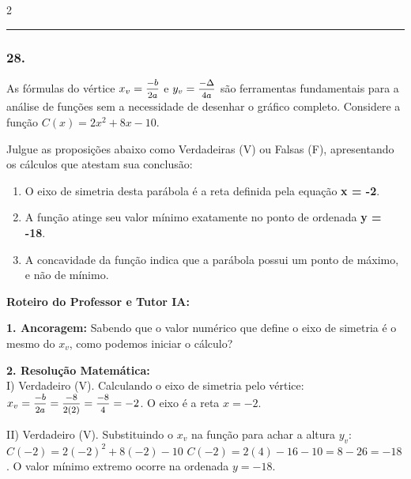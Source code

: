 \begin{multicols*}{2}
\noindent\textcolor{CorLinha}{\rule{\linewidth}{0.5pt}} 
\par\vspace{\espacoPreQuestao}
\subsubsection*{28.} 
\begin{enunciadoLiteral}
As fórmulas do vértice $x_v = \mfrac{-b}{2a}$ e $y_v = \mfrac{-\Delta}{4a}$ são ferramentas fundamentais para a análise de funções sem a necessidade de desenhar o gráfico completo. Considere a função $C(x) = 2x^2 + 8x - 10$.

Julgue as proposições abaixo como Verdadeiras (V) ou Falsas (F), apresentando os cálculos que atestam sua conclusão:

\begin{enumerate}[label=\Roman*., itemsep=\espacoAlt]
    \item O eixo de simetria desta parábola é a reta definida pela equação \textbf{x = -2}.
    \item A função atinge seu valor mínimo exatamente no ponto de ordenada \textbf{y = -18}.
    \item A concavidade da função indica que a parábola possui um ponto de máximo, e não de mínimo.
\end{enumerate}
\end{enunciadoLiteral}

\ifgabarito
    \begin{tcolorbox}[colback=CorTitUm!5, colframe=CorTitUm, boxrule=1pt, arc=4pt, left=6pt, right=6pt, top=6pt, bottom=6pt]
    \small\textbf{\textcolor{CorTitUm}{Roteiro do Professor e Tutor IA:}}\par\vspace{0.1cm}
    \color{CinzaEscuro}
    \textbf{1. Ancoragem:} Sabendo que o valor numérico que define o eixo de simetria é o mesmo do $x_v$, como podemos iniciar o cálculo?\par\vspace{0.1cm}
    \textbf{2. Resolução Matemática:}\\
    I) Verdadeiro (V). Calculando o eixo de simetria pelo vértice:
    $x_v = \mfrac{-b}{2a} = \mfrac{-8}{2(2)} = \mfrac{-8}{4} = -2$. O eixo é a reta $x = -2$.
    
    II) Verdadeiro (V). Substituindo o $x_v$ na função para achar a altura $y_v$:
    $C(-2) = 2(-2)^2 + 8(-2) - 10$
    $C(-2) = 2(4) - 16 - 10 = 8 - 26 = -18$. 
    O valor mínimo extremo ocorre na ordenada $y = -18$.
    

\end{tcolorbox}
\end{multicols*}
